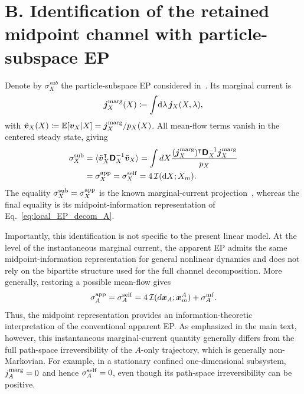 \documentclass[
 longbibliography,
 twocolumn,
 superscriptaddress,
 amsmath,
 amssymb,
 amsthm,
 amsfonts,
 prl,
 floatfix,
]{revtex4-2}
\newcommand{\matbf}[1]{\boldsymbol{\mathsf{#1}}}
\begin{document}
\section{B. Identification of the retained midpoint channel with particle-subspace EP}

Denote by $\sigma_X^{sub}$ the particle-subspace EP considered in~\cite{das2025irreversibility,das2025uraveling}. Its marginal current is
\[
    \bm j_X^{\rm marg}(X)
    \coloneq\int\!\mathrm d\lambda\,\bm j_X(X,\lambda),
\]
with $\tilde{\bm v}_X(X)\coloneq\mathbb E[\bm v_X|X]=\bm j_X^{\rm marg}/p_X(X)$. All mean-flow terms vanish in the centered steady state, giving
\begin{equation*}
\begin{aligned}
    \sigma_X^{\rm sub}
    &=\langle\tilde{\bm v}_X^\intercal\matbf D_X^{-1}\tilde{\bm v}_X\rangle
    =\int dX\frac{(\bm j_X^{\rm marg})^\intercal\matbf D_X^{-1}\bm j_X^{\rm marg}}{p_X}
    \\
    &=\sigma_X^{\rm app}=\sigma_X^{\rm self}
    =4\,\mathcal I(\mathrm dX;X_m).
\end{aligned}
    \label{eq:sub_equal_app_equal_self}
\end{equation*}
The equality $\sigma_X^{\rm sub}=\sigma_X^{\rm app}$ is the known marginal-current projection~\cite{mehl2012role,nakazato2021geometrical}, whereas the final equality is its midpoint-information representation of Eq.~\eqref{eq:local_EP_decom_A}.

Importantly, this identification is not specific to the present linear model. At the level of the instantaneous marginal current, the apparent EP admits the same midpoint-information representation for general nonlinear dynamics and does not rely on the bipartite structure used for the full channel decomposition. More generally, restoring a possible mean-flow gives
\begin{equation*}
    \sigma_A^{\rm app}
    =\sigma_A^{\rm self}
    =4\,\mathcal I(d\bm x_A;\bm x_m^A)+\sigma_A^{\rm mf}.
\end{equation*}
Thus, the midpoint representation provides an information-theoretic interpretation of the conventional apparent EP. As emphasized in the main text, however, this instantaneous marginal-current quantity generally differs from the full path-space irreversibility of the $A$-only trajectory, which is generally non-Markovian. For example, in a stationary confined one-dimensional subsystem, $j_A^{\rm marg}=0$ and hence $\sigma_A^{\rm self}=0$, even though its path-space irreversibility can be positive.
\end{document}

